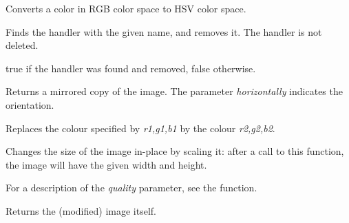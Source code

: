 

\label{wximagergbtohsv}


Converts a color in RGB color space to HSV color space.


\label{wximageremovehandler}


Finds the handler with the given name, and removes it. The handler
is not deleted.



true if the handler was found and removed, false otherwise.




\label{wximagemirror}


Returns a mirrored copy of the image. The parameter {\it horizontally}
indicates the orientation.


\label{wximagereplace}


Replaces the colour specified by {\it r1,g1,b1} by the colour {\it r2,g2,b2}.


\label{wximagerescale}


Changes the size of the image in-place by scaling it: after a call to this function,
the image will have the given width and height.

For a description of the {\it quality} parameter, see the  function.

Returns the (modified) image itself.


